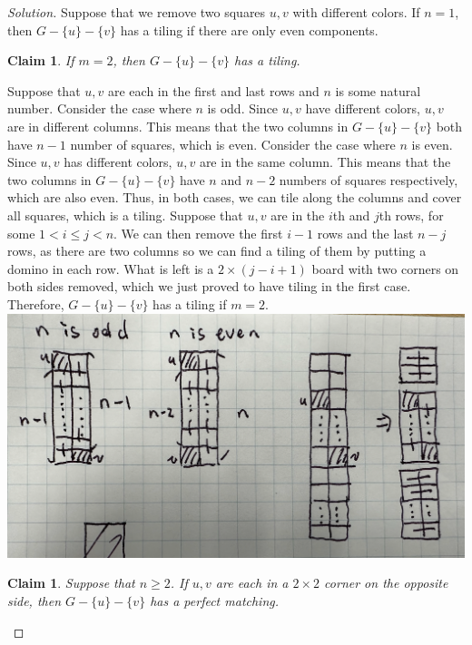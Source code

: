 \documentclass{article}
\newtheorem{claim}[thm]{Claim}
\begin{document}
\begin{enumerate}[label=(\alph*)]
\begin{proof}[Solution]
        Suppose that we remove two squares $u, v$ with different colors. If $n = 1$, then $G - \{u\} - \{v\}$ has a tiling if there are only even components.
        \begin{claim}
            If $m = 2$, then $G - \{u\} - \{v\}$ has a tiling.
        \end{claim}
            Suppose that $u, v$ are each in the first and last rows and $n$ is some natural number. Consider the case where $n$ is odd. Since $u, v$ have different colors, $u, v$ are in different columns. This means that the two columns in $G - \{u\} - \{v\}$ both have $n - 1$ number of squares, which is even. Consider the case where $n$ is even. Since $u, v$ has different colors, $u, v$ are in the same column. This means that the two columns in $G - \{u\} - \{v\}$ have $n$ and $n - 2$ numbers of squares respectively, which are also even. Thus, in both cases, we can tile along the columns and cover all squares, which is a tiling. Suppose that $u, v$ are in the $i$th and $j$th rows, for some $1 < i \leq j < n$. We can then remove the first $i - 1$ rows and the last $n - j$ rows, as there are two columns so we can find a tiling of them by putting a domino in each row. What is left is a $2 \times (j - i + 1)$ board with two corners on both sides removed, which we just proved to have tiling in the first case. Therefore, $G - \{u\} - \{v\}$ has a tiling if $m = 2$.
            \includegraphics[width=.93\textwidth]{Q382b1}
        \begin{claim}
            Suppose that $n \geq 2$. If $u, v$ are each in a $2 \times 2$ corner on the opposite side, then $G - \{u\} - \{v\}$ has a perfect matching.
        \end{claim}

\end{proof}
\end{enumerate}
\end{document}
